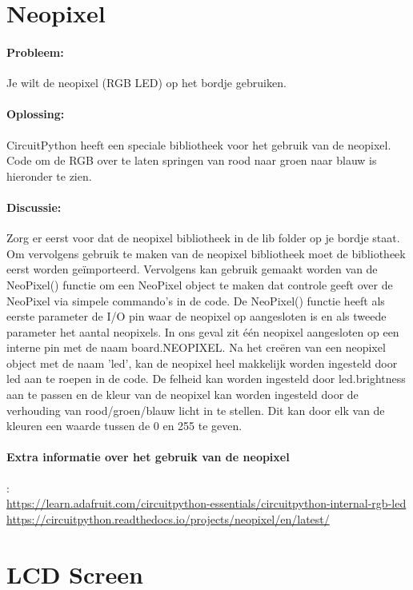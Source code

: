 \newpage
\section{Neopixel}
	\paragraph{Probleem:} Je wilt de neopixel (RGB LED) op het bordje gebruiken.
	\paragraph{Oplossing:} CircuitPython heeft een speciale bibliotheek voor het gebruik van de neopixel. Code om de RGB over te laten springen van rood naar groen naar blauw is hieronder te zien.
	
	
	\paragraph{Discussie:} Zorg er eerst voor dat de neopixel bibliotheek in de lib folder op je bordje staat. Om vervolgens gebruik te maken van de neopixel bibliotheek moet de bibliotheek eerst worden ge\"importeerd. Vervolgens kan gebruik gemaakt worden van de NeoPixel() functie om een NeoPixel object te maken dat controle geeft over de NeoPixel via simpele commando's in de code. De NeoPixel() functie heeft als eerste parameter de I/O pin waar de neopixel op aangesloten is en als tweede parameter het aantal neopixels. In ons geval zit \'e\'en neopixel aangesloten op een interne pin met de naam board.NEOPIXEL. Na het cre\"eren van een neopixel object met de naam 'led', kan de neopixel heel makkelijk worden ingesteld door led aan te roepen in de code. De felheid kan worden ingesteld door led.brightness aan te passen en de kleur van de neopixel kan worden ingesteld door de verhouding van rood/groen/blauw licht in te stellen. Dit kan door elk van de kleuren een waarde tussen de 0 en 255 te geven.
	
	
	\paragraph{Extra informatie over het gebruik van de neopixel}:\\
	
	\url{https://learn.adafruit.com/circuitpython-essentials/circuitpython-internal-rgb-led}
	\url{https://circuitpython.readthedocs.io/projects/neopixel/en/latest/}
	
\section{LCD Screen}
